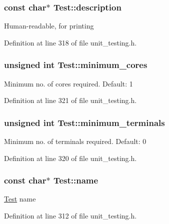 \subsubsection[{\texorpdfstring{description}{description}}]{\setlength{\rightskip}{0pt plus 5cm}const char$\ast$ Test\+::description}\hypertarget{structTest_a294ca3f1114240c908f66216afcad783}{}\label{structTest_a294ca3f1114240c908f66216afcad783}
Human-\/readable, for printing 

Definition at line 318 of file unit\+\_\+testing.\+h.

\subsubsection[{\texorpdfstring{minimum\+\_\+cores}{minimum_cores}}]{\setlength{\rightskip}{0pt plus 5cm}unsigned int Test\+::minimum\+\_\+cores}\hypertarget{structTest_ac203918837b4c6718a020246e189a95a}{}\label{structTest_ac203918837b4c6718a020246e189a95a}
Minimum no. of cores required. Default\+: 1 

Definition at line 321 of file unit\+\_\+testing.\+h.

\subsubsection[{\texorpdfstring{minimum\+\_\+terminals}{minimum_terminals}}]{\setlength{\rightskip}{0pt plus 5cm}unsigned int Test\+::minimum\+\_\+terminals}\hypertarget{structTest_a2741188633c51b8e3cb545fa3971bf60}{}\label{structTest_a2741188633c51b8e3cb545fa3971bf60}
Minimum no. of terminals required. Default\+: 0 

Definition at line 320 of file unit\+\_\+testing.\+h.

\subsubsection[{\texorpdfstring{name}{name}}]{\setlength{\rightskip}{0pt plus 5cm}const char$\ast$ Test\+::name}\hypertarget{structTest_ae44674e48b203d9c26e04e09b6fe5b61}{}\label{structTest_ae44674e48b203d9c26e04e09b6fe5b61}
\hyperlink{structTest}{Test} name 

Definition at line 312 of file unit\+\_\+testing.\+h.

